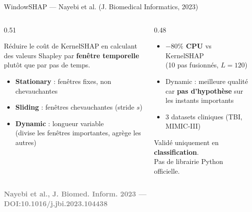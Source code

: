 \documentclass[10pt]{beamer}
\newcommand{\source}[1]{\vspace{6pt}\hfill{\textcolor{gray}{\textbf{\tiny #1}}}}
\begin{document}
\begin{frame}{WindowSHAP --- Nayebi et al. (J. Biomedical Informatics, 2023)}
  \begin{columns}
    \begin{column}{0.51\textwidth}
    	\vspace{-0.3cm}
      \begin{tcolorbox}[
        colback=blue!3, colframe=blue!40!black,
        arc=2mm, boxrule=0.5pt, fonttitle=\bfseries,
        title={Idée centrale}]
        Réduire le coût de KernelSHAP en calculant des valeurs Shapley
        par \textbf{fenêtre temporelle} plutôt que par pas de temps.
      \end{tcolorbox}
      \begin{tcolorbox}[
        colback=orange!3, colframe=orange!50!black,
        arc=2mm, boxrule=0.5pt, fonttitle=\bfseries,
        title={3 variantes}]
        \begin{itemize}
          \item \textbf{Stationary} : fenêtres fixes, non chevauchantes
          \item \textbf{Sliding} : fenêtres chevauchantes (stride $s$)
          \item \textbf{Dynamic} : longueur variable\\
                (divise les fenêtres importantes, agrège les autres)
        \end{itemize}
      \end{tcolorbox}
    \end{column}
    \begin{column}{0.48\textwidth}
    	\vspace{-0.7cm}
      \begin{tcolorbox}[
        colback=green!3, colframe=green!40!black,
        arc=2mm, boxrule=0.5pt, fonttitle=\bfseries,
        title={Résultats clés}]
        \begin{itemize}
          \item \textbf{$-80\%$ CPU} vs KernelSHAP\\
                (10 pas fusionnés, $L=120$)
          \item Dynamic : meilleure qualité car \textbf{pas d'hypothèse} sur les instants importants
          \item 3 datasets cliniques (TBI, MIMIC-III)
        \end{itemize}
      \end{tcolorbox}
      \begin{tcolorbox}[
        colback=red!3, colframe=red!60!black,
        arc=2mm, boxrule=0.5pt, fonttitle=\bfseries,
        title={Limite}]
        Validé uniquement en \textbf{classification}.\\
        Pas de librairie Python officielle.
      \end{tcolorbox}
    \end{column}
  \end{columns}
  \source{Nayebi et al., J. Biomed. Inform. 2023 --- DOI:10.1016/j.jbi.2023.104438}
\end{frame}
\end{document}
